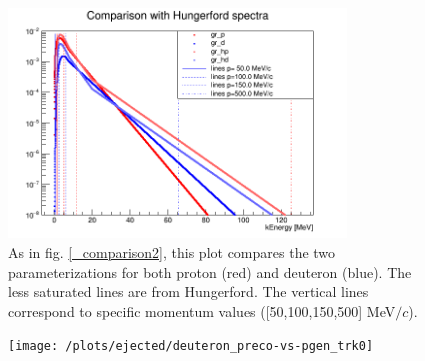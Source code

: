 \documentclass[12pt,a4paper,openright, oneside, titlepage]{book} %
\begin{document}
\begin{figure}[h!]
\centering
\includegraphics[width =0.8\textwidth, keepaspectratio]{new_spectra_2/comparison}
\caption{As in fig. \ref{_comparison2}, this plot  \cite{io:comparison} compares the two parameterizations \cite{Hungerford} \cite{Pasha:spectra} for both proton (red) and deuteron (blue). 
The less saturated lines are from Hungerford. 
The vertical lines correspond to specific momentum values ([50,100,150,500] MeV$/c$).}
\label{_comparison}
\end{figure}

\begin{figure}[!htb]
\centering
\texttt{[image: /plots/ejected/deuteron\_preco-vs-pgen\_trk0]}
\caption{}
\label{_deuteron_preco-vs-pgen_trk0}
\end{figure}
\end{document}
